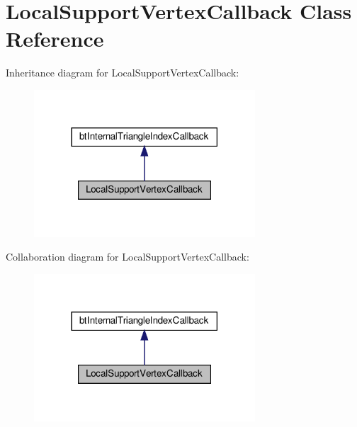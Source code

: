 \hypertarget{classLocalSupportVertexCallback}{}\section{Local\+Support\+Vertex\+Callback Class Reference}
\label{classLocalSupportVertexCallback}


Inheritance diagram for Local\+Support\+Vertex\+Callback\+:
\nopagebreak
\begin{figure}[H]
\begin{center}
\leavevmode
\includegraphics[width=234pt]{classLocalSupportVertexCallback__inherit__graph}
\end{center}
\end{figure}


Collaboration diagram for Local\+Support\+Vertex\+Callback\+:
\nopagebreak
\begin{figure}[H]
\begin{center}
\leavevmode
\includegraphics[width=234pt]{classLocalSupportVertexCallback__coll__graph}
\end{center}
\end{figure}
